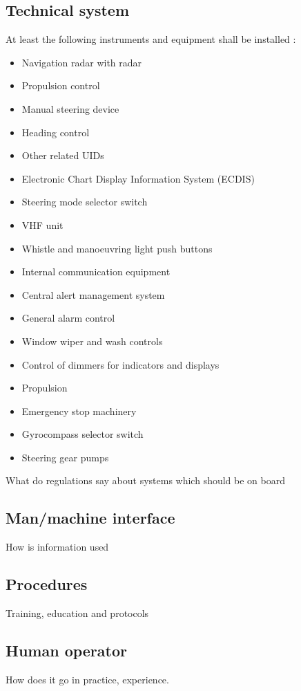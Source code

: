 \subsection{Technical system}
At least the following instruments and equipment shall be installed \cite{DNVGL2011}: 
\begin{multicols}{2}
	\begin{itemize}
		\item Navigation radar with radar
		\item Propulsion control
		\item Manual steering device
		\item Heading control
		\item Other related \ac{UID}s
		\item Electronic Chart Display Information System (ECDIS)
		\item Steering mode selector switch
		\item VHF unit
		\item Whistle and manoeuvring light push buttons
		\item Internal communication equipment
		\item Central alert management system
		\item General alarm control
		\item Window wiper and wash controls
		\item Control of dimmers for indicators and displays
		\item Propulsion
		\item Emergency stop machinery
		\item Gyrocompass selector switch
		\item Steering gear pumps
	\end{itemize}
\end{multicols}


What do regulations say about systems which should be on board


\subsection{Man/machine interface}
How is information used

\subsection{Procedures}
Training, education and protocols

\subsection{Human operator}
How does it go in practice, experience.

